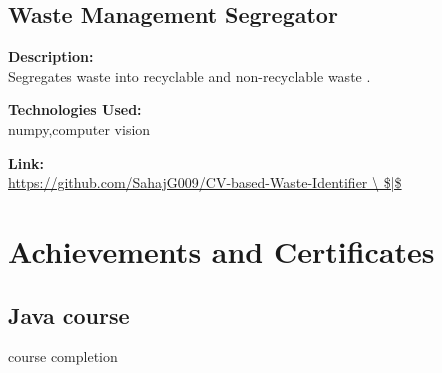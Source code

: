 \documentclass[a4paper,10pt]{article}
\begin{document}
\subsection*{Waste Management Segregator}

\noindent
\begin{minipage}[t]{0.4\textwidth}
  \textbf{Description:}\\
  Segregates waste into recyclable and non-recyclable waste .
\end{minipage}%
\begin{minipage}[t]{0.4\textwidth}
  \textbf{Technologies Used:}\\
  numpy,computer vision
\end{minipage}%
\begin{minipage}[t]{0.2\textwidth}
  \textbf{Link:}\\
  \url{https://github.com/SahajG009/CV-based-Waste-Identifier \ $|$}
\end{minipage}







\section{Achievements and Certificates}

\subsection*{Java course}

\begin{multicols}{2}
    \begin{itemize}
        \Java course completion
    \end{itemize}
    
    \columnbreak
\end{multicols}
\end{document}
